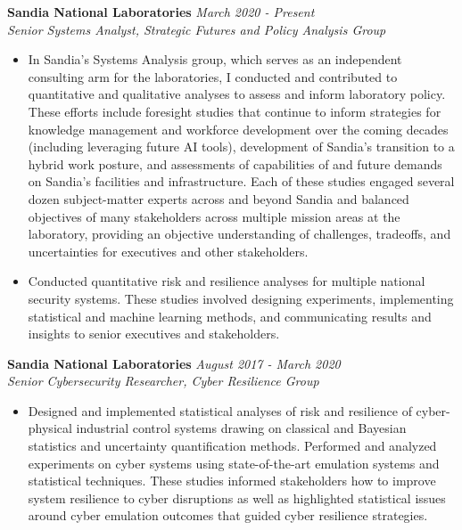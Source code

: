 \documentclass[11pt]{article}
\newenvironment{changemargin}[2]{%
  \begin{list}{}{%
    \setlength{\topsep}{0pt}%
    \setlength{\leftmargin}{#1}%
    \setlength{\rightmargin}{#2}%
    \setlength{\listparindent}{\parindent}%
    \setlength{\itemindent}{\parindent}%
    \setlength{\parsep}{\parskip}%
  }%
  \item[]}{\end{list}
}
\newenvironment{body} {
	\vspace*{-16pt}
	\begin{changemargin}{-0.25in}{-0.5in}
  }	
	{\end{changemargin}
}
\begin{document}
\begin{body}
	\vspace{12pt}
	
	\textbf{Sandia National Laboratories} \hfill \emph{March 2020 - Present}\\
	\emph{Senior Systems Analyst, Strategic Futures and Policy Analysis Group}
	\vspace*{-4pt}
	\begin{itemize}
		\item In Sandia's Systems Analysis group, which serves as an independent consulting arm for the laboratories, I conducted and contributed to quantitative and qualitative analyses to assess and inform laboratory policy. These efforts include foresight studies that continue to inform strategies for knowledge management and workforce development over the coming decades (including leveraging future AI tools), development of Sandia's transition to a hybrid work posture, and assessments of capabilities of and future demands on Sandia's facilities and infrastructure. Each of these studies engaged several dozen subject-matter experts across and beyond Sandia and balanced objectives of many stakeholders across multiple mission areas at the laboratory, providing an objective understanding of challenges, tradeoffs, and uncertainties for executives and other stakeholders.
		\item Conducted quantitative risk and resilience analyses for multiple national security systems. These studies involved designing experiments, implementing statistical and machine learning methods, and communicating results and insights to senior executives and stakeholders.
	\end{itemize}	
	
	\textbf{Sandia National Laboratories} \hfill \emph{August 2017 - March 2020}\\
	\emph{Senior Cybersecurity Researcher, Cyber Resilience Group}
	\vspace*{-4pt}
	\begin{itemize}
		\item Designed and implemented statistical analyses of risk and resilience of cyber-physical industrial control systems drawing on classical and Bayesian statistics and uncertainty quantification methods. Performed and analyzed experiments on cyber systems using state-of-the-art emulation systems and statistical techniques. These studies informed stakeholders how to improve system resilience to cyber disruptions as well as highlighted statistical issues around cyber emulation outcomes that guided cyber resilience strategies.
	\end{itemize}	
	

\end{body}
\end{document}
